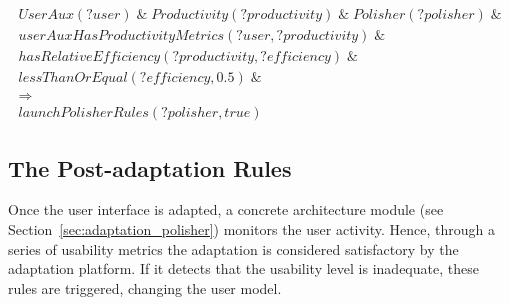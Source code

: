 \footnotesize
\begin{equation} \label{ec:usability_rule}
  \begin{align*} 
  UserAux(?user)\; \&\; Productivity(?productivity)\; \&\; Polisher(?polisher)\; \&\\ 
  userAuxHasProductivityMetrics(?user, ?productivity)\; \& \\
  hasRelativeEfficiency(?productivity, ?efficiency)\; \& \\
  lessThanOrEqual(?efficiency, 0.5)\; \& \\
  \Rightarrow \\
  launchPolisherRules(?polisher, true)
  \end{align*}
\end{equation}
\normalsize

\subsection{The Post-adaptation Rules}
Once the user interface is adapted, a concrete architecture module (see 
Section~\ref{sec:adaptation_polisher}) monitors the user activity. Hence, through
a series of usability metrics the adaptation is considered satisfactory by
the adaptation platform. If it detects that the usability level is inadequate,
these rules are triggered, changing the user model.

